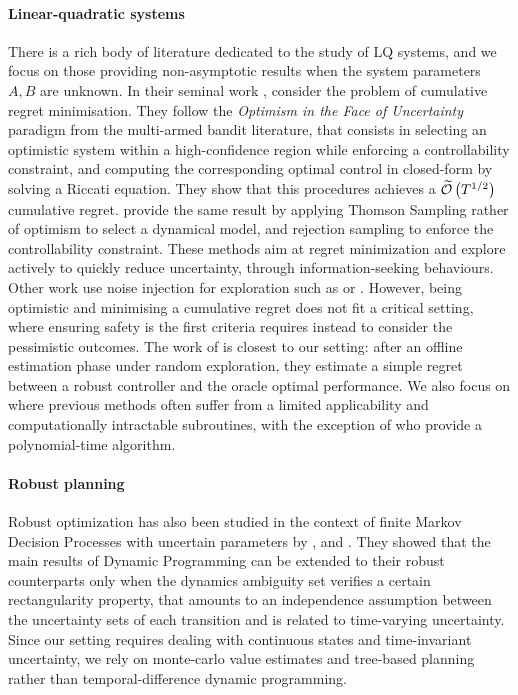\documentclass{article}
\begin{document}
\paragraph{Linear-quadratic systems} There is a rich body of literature dedicated to the study of LQ systems, and we focus on those providing non-asymptotic results when the system parameters $A, B$ are unknown. In their seminal work \citet{abbasi-yadkori11a}, consider the problem of cumulative regret minimisation. They follow the \emph{Optimism in the Face of Uncertainty} paradigm from the multi-armed bandit literature, that consists in selecting an optimistic system within a high-confidence region while enforcing a controllability constraint, and computing the corresponding optimal control in closed-form by solving a Riccati equation. They show that this procedures achieves a $\widetilde{\mathcal{O}}\left(T^{1/2}\right)$ cumulative regret. \citet{abeille18a} provide the same result by applying Thomson Sampling rather of optimism to select a dynamical model, and rejection sampling to enforce the controllability constraint. These methods aim at regret minimization and explore actively to quickly reduce uncertainty, through information-seeking behaviours. Other work use noise injection for exploration such as \citep{Dean2017} or \citep{Dean2018}. However, being optimistic and minimising a cumulative regret does not fit a critical setting, where ensuring safety is the first criteria requires instead to consider the pessimistic outcomes.
The work of \citet{Dean2017} is closest to our setting: after an offline estimation phase under random exploration, they estimate a simple regret between a robust controller and the oracle optimal performance. 
We also focus on where previous methods often suffer from a limited applicability and computationally intractable subroutines, with the exception of \cite{Dean2018} who provide a polynomial-time algorithm.

\paragraph{Robust planning}
Robust optimization has also been studied in the context of finite Markov Decision Processes with uncertain parameters by \citet{Iyengar2005}, \citet{Nilim2005} and \citet{Wiesemann2013}. They showed that the main results of Dynamic Programming can be extended to their robust counterparts only when the dynamics ambiguity set verifies a certain rectangularity property, that amounts to an independence assumption between the uncertainty sets of each transition and is related to time-varying uncertainty. Since our setting requires dealing with continuous states and time-invariant uncertainty, we rely on monte-carlo value estimates and tree-based planning rather than temporal-difference dynamic programming.
\end{document}
